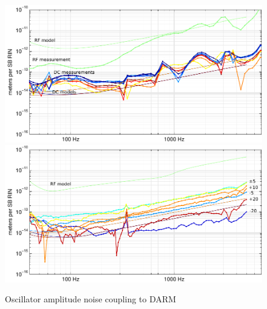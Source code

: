\begin{figure} %
\includegraphics[]{figures/oscAM-L1.pdf}
\includegraphics[]{figures/oscAM-H1.pdf}
\caption[Oscillator amplitude noise coupling (measured and modeled)]{\label{fig:osc-AM}Oscillator amplitude noise coupling to DARM}
\end{figure}

